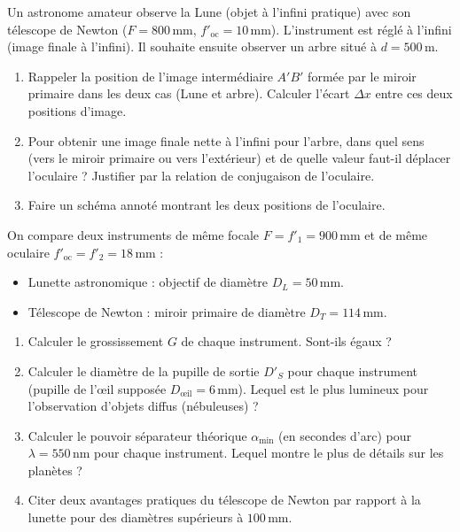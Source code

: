 \documentclass[11pt]{article}
\begin{document}
\begin{exercice}
Un astronome amateur observe la Lune (objet à l'infini pratique) avec son télescope de Newton ($F = 800\,\text{mm}$, $f'_{\text{oc}} = 10\,\text{mm}$). L'instrument est réglé à l'infini (image finale à l'infini). Il souhaite ensuite observer un arbre situé à $d = 500\,\text{m}$.
\begin{enumerate}
    \item Rappeler la position de l'image intermédiaire $A'B'$ formée par le miroir primaire dans les deux cas (Lune et arbre). Calculer l'écart $\Delta x$ entre ces deux positions d'image.
    \item Pour obtenir une image finale nette à l'infini pour l'arbre, dans quel sens (vers le miroir primaire ou vers l'extérieur) et de quelle valeur faut-il déplacer l'oculaire ? Justifier par la relation de conjugaison de l'oculaire.
    \item Faire un schéma annoté montrant les deux positions de l'oculaire.
\end{enumerate}
\end{exercice}

\begin{exercice}
On compare deux instruments de même focale $F = f'_1 = 900\,\text{mm}$ et de même oculaire $f'_{\text{oc}} = f'_2 = 18\,\text{mm}$ :
\begin{itemize}
    \item Lunette astronomique : objectif de diamètre $D_L = 50\,\text{mm}$.
    \item Télescope de Newton : miroir primaire de diamètre $D_T = 114\,\text{mm}$.
\end{itemize}
\begin{enumerate}
    \item Calculer le grossissement $G$ de chaque instrument. Sont-ils égaux ?
    \item Calculer le diamètre de la pupille de sortie $D'_S$ pour chaque instrument (pupille de l'œil supposée $D_{\text{œil}} = 6\,\text{mm}$). Lequel est le plus lumineux pour l'observation d'objets diffus (nébuleuses) ?
    \item Calculer le pouvoir séparateur théorique $\alpha_{\min}$ (en secondes d'arc) pour $\lambda = 550\,\text{nm}$ pour chaque instrument. Lequel montre le plus de détails sur les planètes ?
    \item Citer deux avantages pratiques du télescope de Newton par rapport à la lunette pour des diamètres supérieurs à $100\,\text{mm}$.
\end{enumerate}
\end{exercice}
\end{document}
